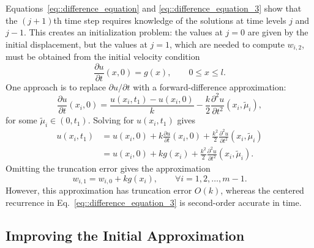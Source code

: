 \documentclass[a4paper]{article}
\begin{document}
Equations~\ref{eq::difference_equation} and \ref{eq::difference_equation_3} show that the $(j+1)$th time step requires knowledge of the solutions at time levels $j$ and $j-1$. This creates an initialization problem: the values at $j=0$ are given by the initial displacement, but the values at $j=1$, which are needed to compute $w_{i,2}$, must be obtained from the initial velocity condition
\begin{equation}
\frac{\partial u}{\partial t}(x,0)=g(x),\qquad 0\leq x\leq l.
\end{equation}
One approach is to replace $\partial u/\partial t$ with a forward-difference approximation:
\begin{equation}
\frac{\partial u}{\partial t}(x_i,0)=\frac{u(x_i,t_1)-u(x_i,0)}{k}-\frac{k}{2}\frac{\partial^2u}{\partial t^2}(x_i,\widetilde{\mu}_i),
\end{equation}
for some $\widetilde{\mu}_i\in(0,t_1)$. Solving for $u(x_i,t_1)$ gives
\begin{equation}
\begin{aligned}
u(x_i,t_1)&=u(x_i,0)+k\frac{\partial u}{\partial t}(x_i,0)+\frac{k^2}{2}\frac{\partial^2u}{\partial t^2}(x_i,\widetilde{\mu}_i)\\
&=u(x_i,0)+kg(x_i)+\frac{k^2}{2}\frac{\partial^2u}{\partial t^2}(x_i,\widetilde{\mu}_i).
\end{aligned}
\end{equation}
Omitting the truncation error gives the approximation
\begin{equation}
w_{i,1}=w_{i,0}+kg(x_i),\qquad \forall i=1,2,\ldots,m-1.
\end{equation}
However, this approximation has truncation error $O(k)$, whereas the centered recurrence in Eq.~\ref{eq::difference_equation_3} is second-order accurate in time.

\subsection{Improving the Initial Approximation}
\end{document}
